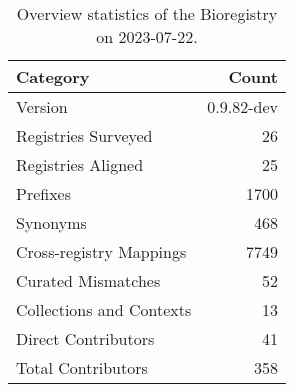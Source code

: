 \begin{table}
\caption{Overview statistics of the Bioregistry on 2023-07-22.}
\label{tab:bioregistry-summary}
\begin{tabular}{lr}
\toprule
Category & Count \\
\midrule
Version & 0.9.82-dev \\
Registries Surveyed & 26 \\
Registries Aligned & 25 \\
Prefixes & 1700 \\
Synonyms & 468 \\
Cross-registry Mappings & 7749 \\
Curated Mismatches & 52 \\
Collections and Contexts & 13 \\
Direct Contributors & 41 \\
Total Contributors & 358 \\
\bottomrule
\end{tabular}
\end{table}
